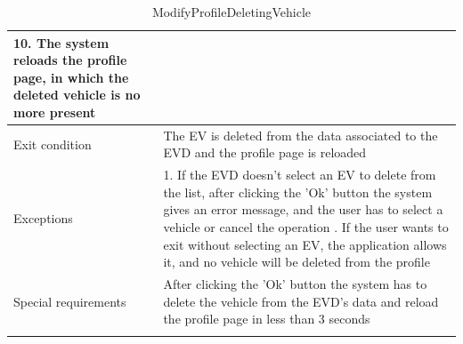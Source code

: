 \begin{center}
\begin{longtable}{p{4cm} p{11cm}}
                    10. The system reloads the profile page, in which the deleted vehicle is no more present \\
     \hline
     Exit condition &  The EV is deleted from the data associated to the EVD and the profile page is reloaded \\
     \hline
     Exceptions &   1. If the EVD doesn't select an EV to delete from the list, after clicking the 'Ok' button the                     system gives an error message, and the user has to select a vehicle or cancel the operation                     \newline
                    2. If the user wants to exit without selecting an EV, the application allows it, and no vehicle will be deleted from the profile\\
     \hline
     Special requirements & After clicking the 'Ok' button the system has to delete the vehicle from the EVD's data and reload the profile page in less than 3 seconds \\
     \hline
    \caption{ModifyProfileDeletingVehicle}
    \label{tab:ModifyProfileDeletingVehicle}
    \end{longtable}
\end{center}

